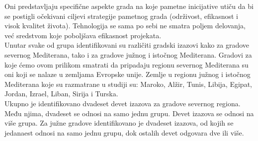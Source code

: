 \documentclass[a4paper,12pt]{article}
\begin{document}
{Oni predstavljaju specifične aspekte grada na koje pametne inicijative utiču da bi se postigli očekivani ciljevi strategije pametnog grada (održivost, efikasnost i visok kvalitet života). Tehnologija se sama po sebi ne smatra poljem delovanja, već sredstvom koje poboljšava efikasnost projekata. \\

Unutar svake od grupa identifikovani su različiti gradski izazovi kako za gradove severnog Mediterana, tako i za gradove južnog i istočnog Mediterana. Gradovi za koje ćemo ovom prilikom smatrati da pripadaju regionu severnog Mediterana su oni koji se nalaze u zemljama Evropske unije. Zemlje u regionu južnog i istočnog Mediterana koje su razmatrane u studiji su: Maroko, Alžir, Tunis, Libija, Egipat, Jordan, Izrael, Liban, Sirija i Turska. \\

Ukupno je identifikovano dvadeset devet izazova za gradove severnog regiona. Među njima, dvadeset se odnosi na samo jednu grupu. Devet izazova se odnosi na više grupa. Za južne gradove identifikovano je dvadeset izazova, od kojih se jedanaest odnosi na samo jednu grupu, dok ostalih devet odgovara dve ili više.\\

}
\end{document}
